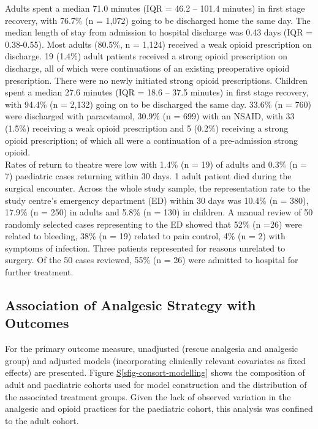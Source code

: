 \documentclass[
  letterpaper,
  DIV=11,
  numbers=noendperiod]{scrreprt}
\newcommand*\quartosfigref[1]{Figure \hyperref[#1]{S\ref{#1}}}
\begin{document}
Adults spent a median 71.0 minutes (IQR = 46.2 -- 101.4 minutes) in
first stage recovery, with 76.7\% (n = 1,072) going to be discharged
home the same day. The median length of stay from admission to hospital
discharge was 0.43 days (IQR = 0.38-0.55). Most adults (80.5\%, n =
1,124) received a weak opioid prescription on discharge. 19 (1.4\%)
adult patients received a strong opioid prescription on discharge, all
of which were continuations of an existing preoperative opioid
prescription. There were no newly initiated strong opioid prescriptions.
Children spent a median 27.6 minutes (IQR = 18.6 -- 37.5 minutes) in
first stage recovery, with 94.4\% (n = 2,132) going on to be discharged
the same day. 33.6\% (n = 760) were discharged with paracetamol, 30.9\%
(n = 699) with an NSAID, with 33 (1.5\%) receiving a weak opioid
prescription and 5 (0.2\%) receiving a strong opioid prescription; of
which all were a continuation of a pre-admission strong opioid.\\
Rates of return to theatre were low with 1.4\% (n = 19) of adults and
0.3\% (n = 7) paediatric cases returning within 30 days. 1 adult patient
died during the surgical encounter. Across the whole study sample, the
representation rate to the study centre's emergency department (ED)
within 30 days was 10.4\% (n = 380), 17.9\% (n = 250) in adults and
5.8\% (n = 130) in children. A manual review of 50 randomly selected
cases representing to the ED showed that 52\% (n =26) were related to
bleeding, 38\% (n = 19) related to pain control, 4\% (n = 2) with
symptoms of infection. Three patients represented for reasons unrelated
to surgery. Of the 50 cases reviewed, 55\% (n = 26) were admitted to
hospital for further treatment.

\subsection{Association of Analgesic Strategy with
Outcomes}\label{association-of-analgesic-strategy-with-outcomes}

For the primary outcome measure, unadjusted (rescue analgesia and
analgesic group) and adjusted models (incorporating clinically relevant
covariates as fixed effects) are presented.
\quartosfigref{sfig-consort-modelling} shows the composition of adult
and paediatric cohorts used for model construction and the distribution
of the associated treatment groups. Given the lack of observed variation
in the analgesic and opioid practices for the paediatric cohort, this
analysis was confined to the adult cohort.
\end{document}
